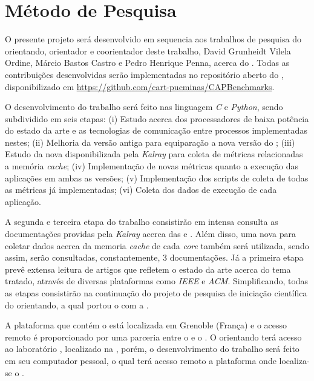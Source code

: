 \documentclass[
    12pt,               %
    openright,          %
    twoside,            %
    a4paper,            %
    english,            %
    brazil,             %
    ]{abntex2}
\begin{document}
\chapter{Método de Pesquisa}
\label{cap:metodo-pesquisa}

O presente projeto será desenvolvido em sequencia aos trabalhos de pesquisa do orientando, orientador e coorientador deste trabalho, David Grunheidt Vilela Ordine, Márcio Bastos Castro e Pedro Henrique Penna, acerca do \mppa. Todas as contribuições desenvolvidas serão implementadas no repositório aberto do \capb, disponibilizado em \url{https://github.com/cart-pucminas/CAPBenchmarks}.
    
O desenvolvimento do trabalho será feito nas linguagem \textit{C} e \textit{Python}, sendo subdividido em seis etapas:
(i) Estudo acerca dos processadores \manycore de baixa potência do estado da arte e as tecnologias de comunicação entre processos implementadas nestes;
(ii) Melhoria da versão antiga para equiparação a nova versão do \capb; 
(iii) Estudo da nova \api disponibilizada pela \textit{Kalray} para coleta de métricas relacionadas a memória \textit{cache};
(iv) Implementação de novas métricas quanto a execução das aplicações em ambas as versões; 
(v) Implementação dos scripts de coleta de todas as métricas já implementadas; 
(vi) Coleta dos dados de execução de cada aplicação.

A segunda e terceira etapa do trabalho consistirão em intensa consulta as documentações providas pela \textit{Kalray} acerca das \apis \async e \ipc. Além disso, uma nova \api para coletar dados acerca da memoria \textit{cache} de cada \textit{core} também será utilizada, sendo assim, serão consultadas, constantemente, 3 documentações. Já a primeira etapa prevê extensa leitura de artigos que refletem o estado da arte acerca do tema tratado, através de diversas plataformas como \textit{IEEE} e \textit{ACM}. Simplificando, todas as etapas consistirão na continuação do projeto de pesquisa de iniciação científica do orientando, a qual portou o \capb com a \api \async.

A plataforma que contém o \mppa está localizada em Grenoble (França) e o acesso
remoto é proporcionado por uma parceria entre o \lapesd e o \lig. O orientando terá acesso ao laboratório \lapesd, localizado na \ufsc, porém, o desenvolvimento do trabalho será feito em seu computador pessoal, o qual terá acesso remoto a plataforma onde localiza-se o \mppa. 

\end{document}
